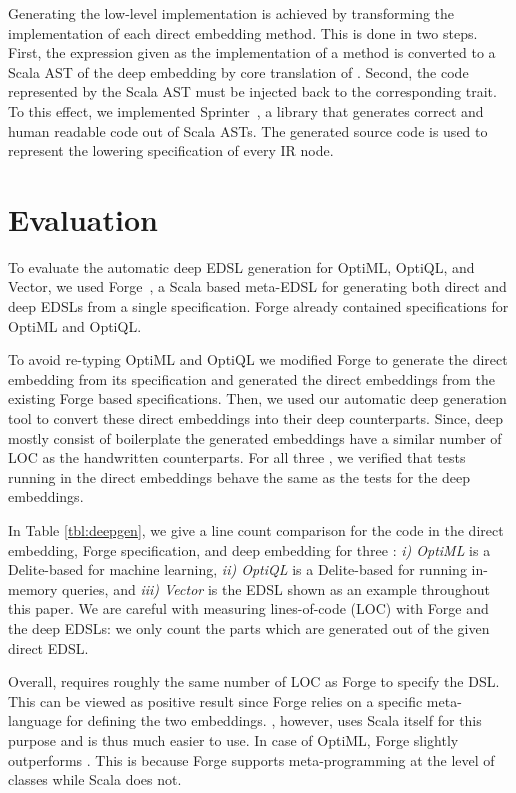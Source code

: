 Generating the low-level implementation is achieved by transforming the
implementation of each direct embedding method. This is done in two steps.
First, the expression given as the implementation of a method is converted to
a Scala AST of the deep embedding by core translation of \yy. Second, the
code represented by the Scala AST must be injected back to the corresponding
trait. To this effect, we implemented Sprinter~\cite{sprinter}, a library that generates
correct and human readable code out of Scala ASTs. The generated source code
is used to represent the lowering specification of every IR node.

\section{Evaluation}
\label{sec:eval-deepgen}

To evaluate the automatic deep EDSL generation for OptiML, OptiQL, and Vector,
we used Forge~\cite{forge}, a Scala based meta-EDSL for generating both direct
and deep EDSLs from a single specification. Forge already contained
specifications for OptiML and OptiQL.

To avoid re-typing OptiML and OptiQL we modified Forge to generate the direct
embedding from its specification and generated the direct embeddings
from the existing Forge based \edsl specifications. Then, we used our automatic deep
generation tool to convert these direct embeddings into their deep
counterparts. Since, deep \edsls mostly consist of boilerplate the generated
embeddings have a similar number of LOC as the handwritten counterparts. For all
three \edsls, we verified that tests running in the direct embeddings behave the
same as the tests for the deep embeddings.

In Table \ref{tbl:deepgen}, we give a line count comparison for the code in
the direct embedding, Forge specification, and deep embedding for three \edsls:
\emph{i) OptiML} is a Delite-based \edsl for machine learning,
\emph{ii) OptiQL} is a Delite-based \edsl for running in-memory queries, and
\emph{iii) Vector} is the EDSL shown as an example throughout this paper.
We are careful with measuring lines-of-code (LOC) with Forge and the deep EDSLs: we only
count the parts which are generated out of the given direct EDSL.

Overall, \yy requires roughly the same number of LOC as Forge to specify the DSL.
This can be viewed as positive result since Forge relies on a specific meta-language
 for defining the two embeddings. \yy, however, uses Scala itself
for this purpose and is thus much easier to use. In case of OptiML, Forge
slightly outperforms \yy. This is because Forge supports meta-programming at
the level of classes while Scala does not.

